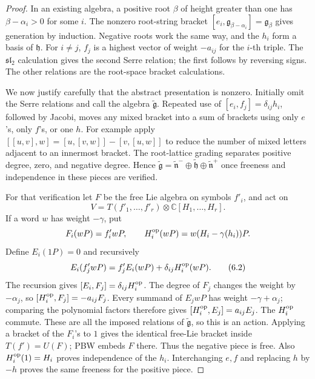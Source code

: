 \begin{proof}
In an existing algebra, a positive root \(\beta\) of height
greater than one has \(\beta-\alpha_i>0\) for some \(i\).
The nonzero root-string bracket
\([e_i,\mathfrak g_{\beta-\alpha_i}]=\mathfrak g_\beta\)
gives generation by induction. Negative roots work the same way,
and the \(h_i\) form a basis of \(\mathfrak h\).
For \(i\ne j\), \(f_j\) is a highest vector of weight
\(-a_{ij}\) for the \(i\)-th triple. The
\(\mathfrak{sl}_2\) calculation gives the second Serre relation;
the first follows by reversing signs. The other relations
are the root-space bracket calculations.

We now justify carefully that the abstract presentation is
nonzero. Initially omit the Serre relations and call the algebra
\(\widetilde{\mathfrak g}\). Repeated use of
\([e_i,f_j]=\delta_{ij}h_i\), followed by Jacobi, moves any
mixed bracket into a sum of brackets using only \(e\)'s,
only \(f\)'s, or one \(h\). For example apply
\([[u,v],w]=[u,[v,w]]-[v,[u,w]]\) to reduce the number
of mixed letters adjacent to an innermost bracket.
The root-lattice grading separates positive degree, zero,
and negative degree. Hence
\(\widetilde{\mathfrak g}=
\widetilde{\mathfrak n}^-\oplus\widetilde{\mathfrak h}
\oplus\widetilde{\mathfrak n}^+\) once freeness and
independence in these pieces are verified.

For that verification let \(F\) be the free Lie algebra on
symbols \(f'_i\), and act on
\[
 V=T(f'_1,\ldots,f'_r)\otimes\mathbb C[H_1,\ldots,H_r].
\]
If a word \(w\) has weight \(-\gamma\), put
\[
 F_i(wP)=f'_iwP,\qquad
 H_i^{\rm op}(wP)=w(H_i-\gamma(h_i))P.
\]
Define \(E_i(1P)=0\) and recursively
\[
 E_i(f'_j wP)=f'_jE_i(wP)+\delta_{ij}H_i^{\rm op}(wP).
 \tag{6.2}
\]
The recursion gives \([E_i,F_j]=\delta_{ij}H_i^{\rm op}\).
The degree of \(F_j\) changes the weight by \(-\alpha_j\),
so \([H_i^{\rm op},F_j]=-a_{ij}F_j\).
Every summand of \(E_jwP\) has weight
\(-\gamma+\alpha_j\); comparing the polynomial factors
therefore gives \([H_i^{\rm op},E_j]=a_{ij}E_j\).
The \(H_i^{\rm op}\) commute. These are all the imposed
relations of \(\widetilde{\mathfrak g}\), so this is an action.
Applying a bracket of the \(F_i\)'s to \(1\) gives the
identical free-Lie bracket inside \(T(f')=U(F)\);
PBW embeds \(F\) there. Thus the negative piece is free.
Also \(H_i^{\rm op}(1)=H_i\) proves independence of the \(h_i\).
Interchanging \(e,f\) and replacing \(h\) by \(-h\)
proves the same freeness for the positive piece.


\end{proof}
